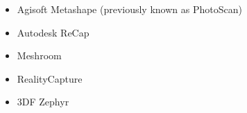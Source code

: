 
\begin{itemize}
\item Agisoft Metashape (previously known as PhotoScan)
\item Autodesk ReCap
\item Meshroom
\item RealityCapture
\item 3DF Zephyr
\end{itemize}
